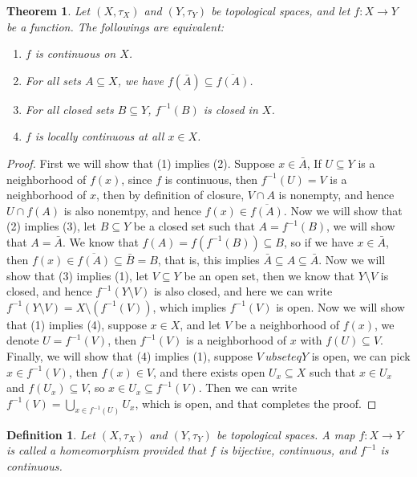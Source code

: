 \documentclass[11pt]{book}
\theoremstyle{break}
\theoremstyle{break}
\newtheorem{thm}{Theorem}[section]
\newtheorem{defn}{Definition}[corL]
\begin{document}
\begin{thm}
Let $(X,\tau_X)$ and $(Y,\tau_Y)$ be topological spaces, and let $f:X \to Y$ be a function. The followings are equivalent:
\begin{enumerate}[topsep=3pt,itemsep=-1ex,partopsep=1ex,parsep=1ex]
\item $f$ is continuous on $X$.
\item For all sets $A \subseteq X$, we have $f(\bar{A}) \subseteq \overline{f(A)}$.
\item For all closed sets $B \subseteq Y$, $f^{-1}(B)$ is closed in $X$.
\item $f$ is locally continuous at all $x \in X$.
\end{enumerate}
\end{thm}
\begin{proof}
First we will show that (1) implies (2). Suppose $x \in \bar{A}$, If $U\subseteq Y$ is a neighborhood of $f(x)$, since $f$ is continuous, then $f^{-1}(U) = V$ is a neighborhood of $x$, then by definition of closure, $V\cap A$ is nonempty, and hence $U \cap f(A)$ is also nonemtpy, and hence $f(x)\in \overline{ f(A)}$. Now we will show that (2) implies (3), let $B \subseteq Y$ be a closed set such that $A = f^{-1}(B)$, we will show that $A = \bar{A}$. We know that $f(A) = f(f^{-1}(B)) \subseteq B$, so if we have $x \in \bar{A}$, then $f(x) \in \overline{ f(A)} \subseteq \bar{B} = B$, that is, this implies $\bar{A}\subseteq A\subseteq \bar{A}$. Now we will show that (3) implies (1), let $V \subseteq Y$ be an open set, then we know that $Y\setminus V$ is closed, and hence $f^{-1}(Y \setminus V)$ is also closed, and here we can write $f^{-1}(Y\setminus V) = X\setminus (f^{-1}(V))$, which implies $f^{-1}(V)$ is open. Now we will show that (1) implies (4), suppose $x \in X$, and let $V$ be a neighborhood of $f(x)$, we denote $U = f^{-1}(V)$, then $f^{-1}(V)$ is a neighborhood of $x$ with $f(U)\subseteq V$. Finally, we will show that (4) implies (1), suppose $V\ ubseteq Y$ is open, we can pick $x \in f^{-1}(V)$, then $f(x) \in V$, and there exists open $U_x \subseteq X$ such that $x \in U_x$ and $f(U_x) \subseteq V$, so $x \in U_x \subseteq f^{-1}(V)$. Then we can write $f^{-1}(V) = \bigcup_{x \in f^{-1}(U)}U_x$, which is open, and that completes the proof. 
\end{proof}


\begin{defn}
Let $(X,\tau_X)$ and $(Y,\tau_Y)$ be topological spaces. A map $f:X\to Y$ is called a homeomorphism provided that $f$ is bijective, continuous, and $f^{-1}$ is continuous. 
\end{defn}
\end{document}
